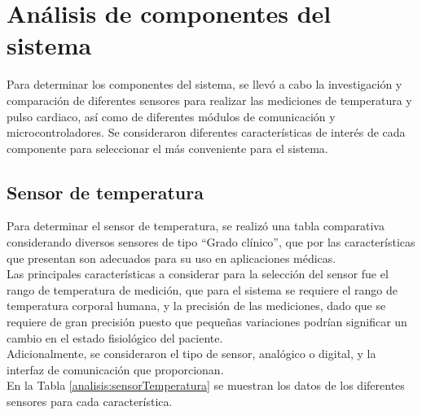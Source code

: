 
\section{Análisis de componentes del sistema}
Para determinar los componentes del sistema, se llevó a cabo la investigación y comparación de diferentes sensores para realizar las mediciones de temperatura y pulso cardiaco, así como de diferentes módulos de comunicación y microcontroladores. Se consideraron diferentes características de interés de cada componente para seleccionar el más conveniente para el sistema.


\subsection{Sensor de temperatura}
Para determinar el sensor de temperatura, se realizó una tabla comparativa considerando diversos sensores de tipo “Grado clínico”, que por las características que presentan son adecuados para su uso en aplicaciones médicas. \\

Las principales características a considerar para la selección del sensor fue el rango de temperatura de medición, que para el sistema se requiere el rango de temperatura corporal humana, y la precisión de las mediciones, dado que se requiere de gran precisión puesto que pequeñas variaciones podrían significar un cambio en el estado fisiológico del paciente.\\

Adicionalmente, se consideraron el tipo de sensor, analógico o digital, y la interfaz de comunicación que proporcionan.\\

En la Tabla \ref{analisis:sensorTemperatura} se muestran los datos de los diferentes sensores para cada característica.


